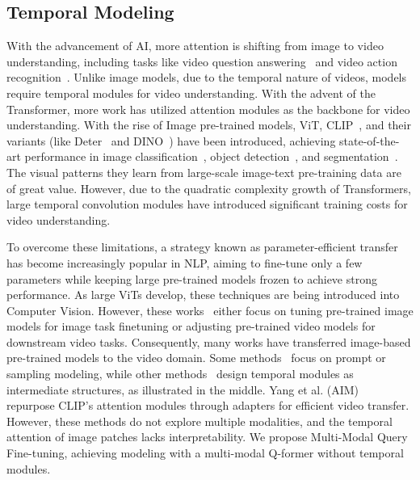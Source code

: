 \subsection{Temporal Modeling}
With the advancement of AI, more attention is shifting from image to video understanding, including tasks like video question answering~\cite{li2022invariant,xiao2022video,10334011} and video action recognition~\cite{feichtenhofer2017spatiotemporal,wang2021actionclip,qi2022weakly}. Unlike image models, due to the temporal nature of videos, models require temporal modules for video understanding. With the advent of the Transformer, more work has utilized attention modules as the backbone for video understanding. With the rise of Image pre-trained models, ViT, CLIP~\cite{radford2021learning}, and their variants (like Deter~\cite{carion2020end} and DINO~\cite{caron2021emerging}) have been introduced, achieving state-of-the-art performance in image classification~\cite{deng2009imagenet,9917532,10283961}, object detection~\cite{zhao2019object,9786052,9548849}, and segmentation~\cite{minaee2021image}. The visual patterns they learn from large-scale image-text pre-training data are of great value.
However, due to the quadratic complexity growth of Transformers, large temporal convolution modules have introduced significant training costs for video understanding.

To overcome these limitations, a strategy known as parameter-efficient transfer~\cite{hu2021lora,he2021effectiveness} has become increasingly popular in NLP, aiming to fine-tune only a few parameters while keeping large pre-trained models frozen to achieve strong performance. As large ViTs develop, these techniques are being introduced into Computer Vision. However, these works~\cite{liu2023visual,bao2021beit} either focus on tuning pre-trained image models for image task finetuning or adjusting pre-trained video models for downstream video tasks. Consequently, many works have transferred image-based pre-trained models to the video domain. Some methods~\cite{fang2021clip2video} focus on prompt or sampling modeling, while other methods~\cite{luo2022clip4clip} design temporal modules as intermediate structures, as illustrated in the middle. Yang et al. (AIM)~\cite{yang2023aim} repurpose CLIP’s attention modules through adapters for efficient video transfer. However, these methods do not explore multiple modalities, and the temporal attention of image patches lacks interpretability. We propose Multi-Modal Query Fine-tuning, achieving modeling with a multi-modal Q-former without temporal modules.


